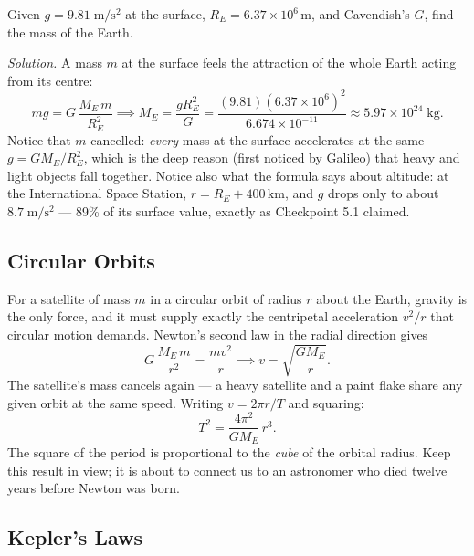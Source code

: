 \begin{workedexample}
Given $g = 9.81\;\mathrm{m/s^2}$ at the surface, $R_E = 6.37\times10^6$\,m,
and Cavendish's $G$, find the mass of the Earth.

\medskip
\textit{Solution.} A mass $m$ at the surface feels the attraction of the
whole Earth acting from its centre:
\begin{equation*}
    mg = G\,\frac{M_E\,m}{R_E^2}
    \implies M_E = \frac{g R_E^2}{G}
    = \frac{(9.81)(6.37\times10^6)^2}{6.674\times10^{-11}}
    \approx 5.97\times10^{24}\;\mathrm{kg}.
\end{equation*}
Notice that $m$ cancelled: \emph{every} mass at the surface accelerates at
the same $g = GM_E/R_E^2$, which is the deep reason (first noticed by
Galileo) that heavy and light objects fall together. Notice also what the
formula says about altitude: at the International Space Station,
$r = R_E + 400\,\mathrm{km}$, and $g$ drops only to about
$8.7\;\mathrm{m/s^2}$ --- 89\% of its surface value, exactly as Checkpoint
5.1 claimed.
\end{workedexample}

\subsection{Circular Orbits}

For a satellite of mass $m$ in a circular orbit of radius $r$ about the Earth,
gravity is the only force, and it must supply exactly the centripetal
acceleration $v^2/r$ that circular motion demands. Newton's second law in the
radial direction gives
\begin{equation}
    G\,\frac{M_E\,m}{r^2} = \frac{m v^2}{r}
    \implies v = \sqrt{\frac{G M_E}{r}}.
\end{equation}
The satellite's mass cancels again --- a heavy satellite and a paint flake
share any given orbit at the same speed. Writing $v = 2\pi r/T$ and squaring:
\begin{equation}
    T^2 = \frac{4\pi^2}{G M_E}\,r^3. \label{eq:kepler3}
\end{equation}
The square of the period is proportional to the \emph{cube} of the orbital
radius. Keep this result in view; it is about to connect us to an astronomer
who died twelve years before Newton was born.

\subsection{Kepler's Laws}

